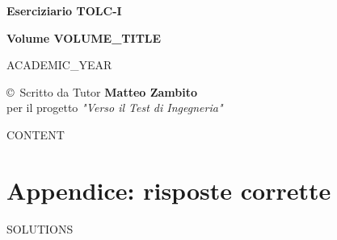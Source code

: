 \documentclass[20pt, a4paper]{article}
\begin{document}
\begin{titlepage}
    \centering
    \vspace*{2cm}
    {\Huge \textbf{Eserciziario TOLC-I} \par}
    \vspace{1cm}
    {\Large \textbf{Volume {{VOLUME_TITLE}}} \par}
    \vspace{4cm}
    {\Large {{ACADEMIC_YEAR}} \par}
    \vspace{4cm}
    \vfill
    {\large \copyright \ Scritto da Tutor \textbf{Matteo Zambito} \\
    per il progetto \textit{"Verso il Test di Ingegneria"} \par}
\end{titlepage}

\newpage
\tableofcontents
\newpage

{{CONTENT}}

\newpage
\section*{Appendice: risposte corrette}
{{SOLUTIONS}}
\end{document}

